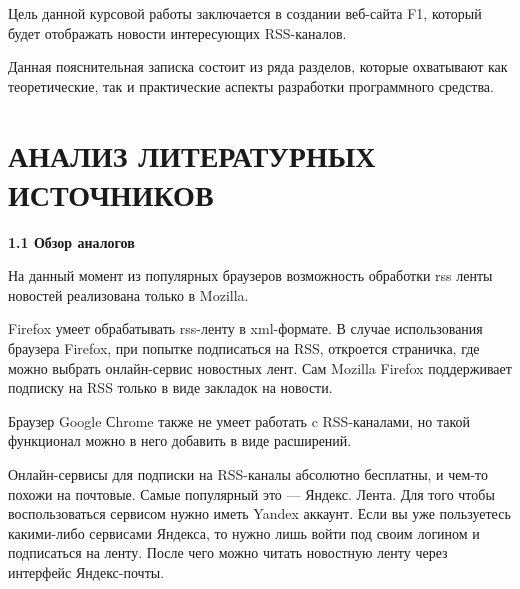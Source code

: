 \documentclass[14pt,a4paper]{extreport}
\begin{document}
\hspace{4ex}Цель данной курсовой работы заключается в создании веб-сайта F1, который будет отображать новости интересующих RSS-каналов. 

\hspace{4ex}Данная пояснительная записка состоит из ряда разделов, которые охватывают как теоретические, так и практические аспекты разработки программного средства. 
\




	
	\newpage

	\item\section*{\normalsize\hspace{4ex}АНАЛИЗ ЛИТЕРАТУРНЫХ ИСТОЧНИКОВ}
	
	\flushleft\hspace{4ex}\textbf{1.1  Обзор аналогов}
	
\flushleft\hspace {4ex}На данный момент из популярных браузеров возможность обработки rss ленты новостей реализована только в Mozilla.

\hspace{4ex}Firefox умеет обрабатывать rss-ленту в xml-формате. В случае использования браузера Firefox, при попытке подписаться на RSS, откроется страничка, где можно выбрать онлайн-сервис новостных лент. Сам Mozilla Firefox поддерживает подписку на RSS только в виде закладок на новости.

\hspace{4ex}Браузер Google Сhrome также не умеет работать c RSS-каналами, но такой функционал можно в него добавить в виде расширений.

\hspace{4ex}Онлайн-сервисы для подписки на RSS-каналы абсолютно бесплатны, и чем-то похожи на почтовые. Самые популярный это — Яндекс. Лента.  Для того чтобы воспользоваться сервисом нужно иметь Yandex аккаунт. Если вы уже пользуетесь какими-либо сервисами Яндекса, то нужно лишь войти под своим логином и подписаться на ленту. После чего можно читать новостную ленту через интерфейс Яндекс-почты.
\end{document}
